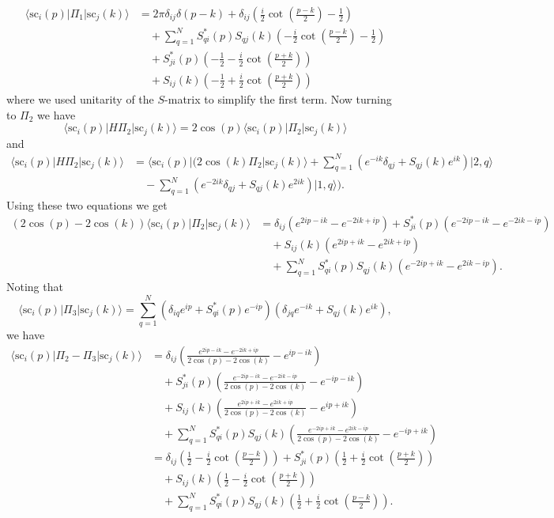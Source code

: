 \documentclass[../thesis-main/thesis-main]{subfiles}
\begin{document}
\begin{align}
\langle\mathrm{sc}_{i}(p)|\Pi_{1}|\mathrm{sc}_{j}(k)\rangle & =  2\pi\delta_{ij}\delta(p-k)+\delta_{ij}\left(\frac{i}{2}\cot\left(\frac{p-k}{2}\right)-\frac{1}{2}\right)\nonumber\\
&\quad+\sum_{q=1}^{N}S_{qi}^{\ast}(p)S_{qj}(k)\left(-\frac{i}{2}\cot\left(\frac{p-k}{2}\right)-\frac{1}{2}\right)\nonumber \\
 &\quad+S_{ji}^{\ast}(p)\left(-\frac{1}{2}-\frac{i}{2}\cot\left(\frac{p+k}{2}\right)\right)\nonumber\\
&\quad+S_{ij}(k)\left(-\frac{1}{2}+\frac{i}{2}\cot\left(\frac{p+k}{2}\right)\right)\label{eq:pi1}
\end{align}
where we used unitarity of the $S$-matrix to simplify the first term.
Now turning to $\Pi_{2}$ we have \[
\langle\mathrm{sc}_{i}(p)|H\Pi_{2}|\mathrm{sc}_{j}(k)\rangle=2\cos(p)\langle\mathrm{sc}_{i}(p)|\Pi_{2}|\mathrm{sc}_{j}(k)\rangle\]
 and 
\begin{align*}
\langle\mathrm{sc}_{i}(p)|H\Pi_{2}|\mathrm{sc}_{j}(k)\rangle & = \langle\mathrm{sc}_{i}(p)|\bigg(2\cos(k)\Pi_{2}|\mathrm{sc}_{j}(k)\rangle+\sum_{q=1}^{N}(e^{-ik}\delta_{qj}+S_{qj}(k)e^{ik})|2,q\rangle\\
&\quad -\sum_{q=1}^{N}(e^{-2ik}\delta_{qj}+S_{qj}(k)e^{2ik})|1,q\rangle\bigg).
\end{align*}
 Using these two equations we get 
\begin{align*}
(2\cos(p)-2\cos(k))\langle\mathrm{sc}_{i}(p)|\Pi_{2}|\mathrm{sc}_{j}(k)\rangle & =  \delta_{ij} (e^{2ip-ik}-e^{-2ik+ip})+S_{ji}^{\ast}(p)(e^{-2ip-ik}-e^{-2ik-ip})\\
 & \quad +S_{ij}(k)(e^{2ip+ik}-e^{2ik+ip})\\
& \quad +\sum_{q=1}^{N}S_{qi}^{\ast}(p)S_{qj}(k)(e^{-2ip+ik}-e^{2ik-ip}).
\end{align*}
 Noting that
\[
\langle\mathrm{sc}_{i}(p)|\Pi_{3}|\mathrm{sc}_{j}(k)\rangle=\sum_{q=1}^{N}(\delta_{iq}e^{ip}+S_{qi}^{\ast}(p)e^{-ip})(\delta_{jq}e^{-ik}+S_{qj}(k)e^{ik}),
\]
we have 
\begin{align}
\langle\mathrm{sc}_{i}(p)|\Pi_{2}-\Pi_{3}|\mathrm{sc}_{j}(k)\rangle & = \delta_{ij}\left(\frac{e^{2ip-ik}-e^{-2ik+ip}}{2\cos(p)-2\cos(k)}-e^{ip-ik}\right)\nonumber\\
&\quad+S_{ji}^{\ast}(p)\left(\frac{e^{-2ip-ik}-e^{-2ik-ip}}{2\cos(p)-2\cos(k)}-e^{-ip-ik}\right)\nonumber \\
 & \quad +S_{ij}(k)\left(\frac{e^{2ip+ik}-e^{2ik+ip}}{2\cos(p)-2\cos(k)}-e^{ip+ik}\right)\nonumber\\
&\quad+\sum_{q=1}^{N}S_{qi}^{\ast}(p)S_{qj}(k)\left(\frac{e^{-2ip+ik}-e^{2ik-ip}}{2\cos(p)-2\cos(k)}-e^{-ip+ik}\right)\nonumber \\
  & = \delta_{ij}\left(\frac{1}{2}-\frac{i}{2}\cot\left(\frac{p-k}{2}\right)\right)+S_{ji}^{\ast}(p)\left(\frac{1}{2}+\frac{i}{2}\cot\left(\frac{p+k}{2}\right)\right)\nonumber\\
&\quad+S_{ij}(k)\left(\frac{1}{2}-\frac{i}{2}\cot\left(\frac{p+k}{2}\right)\right)\nonumber\\
&\quad+\sum_{q=1}^{N}S_{qi}^{\ast}(p)S_{qj}(k)\left(\frac{1}{2}+\frac{i}{2}\cot\left(\frac{p-k}{2}\right)\right).
\label{eq:pi2_pi3}
\end{align}
\end{document}
